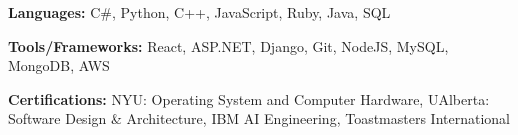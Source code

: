 \begin{siderulesSos}
\begin{skillSection}
\cvskillentry
    {
      \begin{cvsositems}
        \item {\color{black}\textbf{Languages:} C\#, Python, C++, JavaScript, Ruby, Java, SQL}
        \item {\color{black}\textbf{Tools/Frameworks:} React, ASP.NET, Django, Git, NodeJS, MySQL, MongoDB, AWS}
        \item {\color{black}\textbf{Certifications:} NYU: Operating System and Computer Hardware, UAlberta: Software Design \& Architecture, IBM AI Engineering, Toastmasters International}
      \end{cvsositems}
    }
\end{skillSection}
\end{siderulesSos}